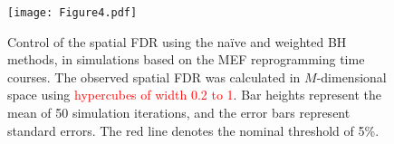 \documentclass{article}
\newcommand\revised[1]{\textcolor{red}{#1}}
\begin{document}

\begin{figure}[bt]
\begin{center}
\texttt{[image: Figure4.pdf]}
\end{center}
\caption{
    Control of the spatial FDR using the na\"ive and weighted BH methods, in simulations based on the MEF reprogramming time courses.
    The observed spatial FDR was calculated in $M$-dimensional space using \revised{hypercubes of width 0.2 to 1}.
    Bar heights represent the mean of 50 simulation iterations, and the error bars represent standard errors.
    The red line denotes the nominal threshold of 5\%.
}
\label{fig:fdr}
\end{figure}

\end{document}
